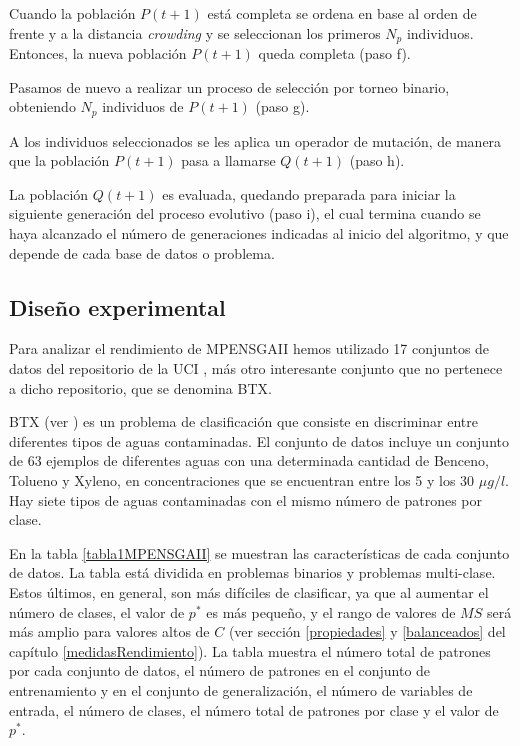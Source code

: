 Cuando la población $P(t+1)$ está completa se ordena en base al orden de frente y a la
distancia \textit{crowding} y se seleccionan los primeros $N_{p}$ individuos. Entonces, la nueva
población $P(t+1)$ queda completa (paso f).

Pasamos de nuevo a realizar un proceso de selección por torneo binario, obteniendo  $N_{p}$
individuos de $P(t+1)$ (paso g).

A los individuos seleccionados se les aplica un operador de mutación, de manera que la
población $P(t+1)$ pasa a llamarse $Q(t+1)$ (paso h).

La población $Q(t+1)$ es evaluada, quedando preparada para iniciar la siguiente
generación del proceso evolutivo (paso i), el cual termina cuando se haya alcanzado el
número de generaciones indicadas al inicio del algoritmo, y que depende de cada base de
datos o problema.

\subsection{Diseño experimental} \label{disenio}
\noindent Para analizar el rendimiento de MPENSGAII hemos utilizado 17
conjuntos de datos del repositorio de la UCI \cite{UCI2007}, más otro interesante
conjunto que no pertenece a dicho repositorio, que se denomina BTX.

BTX (ver \cite{Hervas2008}) es un problema de clasificación que
consiste en discriminar entre diferentes tipos de
aguas contaminadas. El conjunto de datos  incluye un conjunto de 63 ejemplos de diferentes
aguas con
una determinada cantidad de Benceno, Tolueno y Xyleno, en concentraciones que se encuentran
entre los 5 y los 30 $\mu g/l$. Hay siete tipos de aguas contaminadas con el mismo número
de patrones por clase.

En la tabla \ref{tabla1MPENSGAII} se muestran las características de cada
conjunto de datos. La tabla está dividida en problemas binarios y problemas multi-clase.
Estos últimos, en general, son más difíciles de clasificar, ya que al aumentar
el número de clases, el valor de $p^*$ es más pequeño, y el rango de valores de $MS$ será
más amplio para valores altos de $C$ (ver sección \ref{propiedades} y \ref{balanceados}
del
capítulo \ref{medidasRendimiento}). La tabla muestra el número total de patrones por cada
conjunto de datos, el número de patrones en el conjunto de entrenamiento y en el
conjunto de generalización, el número de
variables de entrada, el número de clases, el número total de patrones por clase y el
valor de $p^*$.

